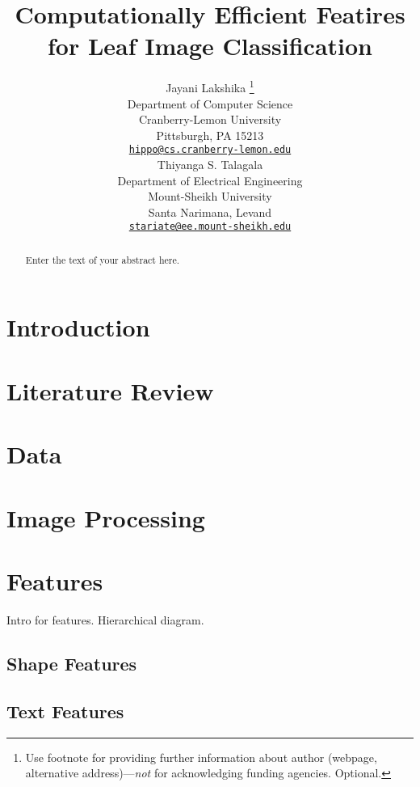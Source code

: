 \documentclass{article}
\title{Computationally Efficient Featires for Leaf Image Classification}
\author{
    Jayani Lakshika
    \thanks{Use footnote for providing further information about author (webpage,
alternative address)---\emph{not} for acknowledging funding agencies.
Optional.}
   \\
    Department of Computer Science \\
    Cranberry-Lemon University \\
  Pittsburgh, PA 15213 \\
  \texttt{\href{mailto:hippo@cs.cranberry-lemon.edu}{\nolinkurl{hippo@cs.cranberry-lemon.edu}}} \\
   \And
    Thiyanga S. Talagala
   \\
    Department of Electrical Engineering \\
    Mount-Sheikh University \\
  Santa Narimana, Levand \\
  \texttt{\href{mailto:stariate@ee.mount-sheikh.edu}{\nolinkurl{stariate@ee.mount-sheikh.edu}}} \\
  }
\begin{document}
\maketitle

\def\tightlist{}


\begin{abstract}
Enter the text of your abstract here.
\end{abstract}


\hypertarget{introduction}{%
\section{Introduction}\label{introduction}}

\hypertarget{literature-review}{%
\section{Literature Review}\label{literature-review}}

\hypertarget{data}{%
\section{Data}\label{data}}

\hypertarget{image-processing}{%
\section{Image Processing}\label{image-processing}}

\hypertarget{features}{%
\section{Features}\label{features}}

Intro for features. Hierarchical diagram.

\hypertarget{shape-features}{%
\subsection{Shape Features}\label{shape-features}}

\hypertarget{text-features}{%
\subsection{Text Features}\label{text-features}}
\end{document}
